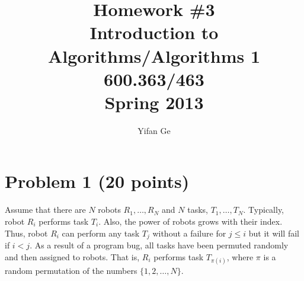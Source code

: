 \documentclass[letterpaper, 11pt]{article}
\begin{document}
\title{Homework \#3 \\ Introduction to Algorithms/Algorithms 1 \\ 600.363/463 \\Spring 2013}
\author{Yifan Ge}

\maketitle




\section{Problem 1 (20 points)} %
Assume that there are $N$ robots $R_1,\dots, R_N$ and $N$ tasks, $T_1, \dots,T_N$.
Typically, robot $R_i$ performs task $T_i$. Also, the power of robots grows with their index.
Thus, robot $R_i$ can perform any task $T_j$ without a failure for $j\le i$ but it will fail if $i<j$.
As a result of a program bug, all tasks have been permuted randomly and then assigned to robots. That is, $R_i$ performs task $T_{\pi(i)}$, where $\pi$ is a random permutation of the numbers $\{1,2,\dots, N\}$.
\end{document}
